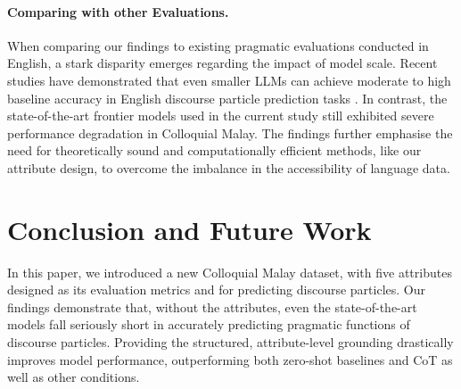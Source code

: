 \documentclass[11pt]{article}
\begin{document}
\paragraph{Comparing with other Evaluations.}
When comparing our findings to existing pragmatic evaluations conducted in English, a stark disparity emerges regarding the impact of model scale. Recent studies have demonstrated that even smaller LLMs can achieve moderate to high baseline accuracy in English discourse particle prediction tasks \citep{sheffield2025just,ruis2023large}. In contrast, the state-of-the-art frontier models used in the current study still exhibited severe performance degradation in Colloquial Malay. The findings further emphasise the need for theoretically sound and computationally efficient methods, like our attribute design, to overcome the imbalance in the accessibility of language data.

\section{Conclusion and Future Work}
In this paper, we introduced a new Colloquial Malay dataset, with five attributes designed as its evaluation metrics and for predicting discourse particles. %
Our findings demonstrate that, without the attributes, even the state-of-the-art models fall seriously short in accurately predicting pragmatic functions of discourse particles. Providing the structured, attribute-level grounding drastically improves model performance, outperforming both zero-shot baselines and CoT as well as other conditions. 
\end{document}
